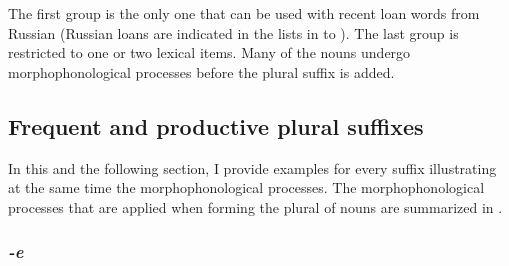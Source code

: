 The first group is the only one that can be used with recent loan words from Russian (Russian loans are indicated in the lists in  to ). The last group is restricted to one or two lexical items. Many of the nouns undergo morphophonological processes before the plural suffix is added. 



\subsection{Frequent and productive plural suffixes}
\label{sec:FrequentAndProductivePluralSuffixes}
In this and the following section, I provide examples for every suffix illustrating at the same time the morphophonological processes. The morphophonological processes that are applied when forming the plural of nouns are summarized in .


\subsubsection*{\textit{-e}}


